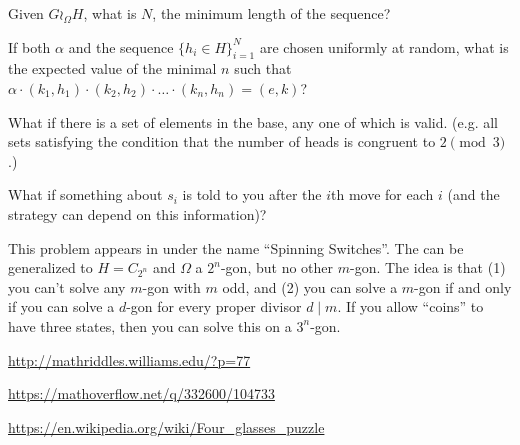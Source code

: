 \documentclass{article}
\begin{document}
\begin{related}
  \item Given $G \wr_\Omega H$, what is $N$, the minimum length of the sequence?
  \item If both $\alpha$ and the sequence $\{h_i \in H\}_{i=1}^N$ are chosen
  uniformly at random, what is the expected value of the minimal $n$ such that $
    \alpha \cdot (k_1, h_1) \cdot (k_2, h_2) \cdot \dots \cdot (k_n, h_n) = (e, k)
  $?
  \item What if there is a set of elements in the base, any one of which is valid.
  (e.g. all sets satisfying the condition that the number of heads is congruent
  to $2 \pmod 3$.)
  \item What if something about $s_i$ is told to you after the $i$th move for each
    $i$ (and the strategy can depend on this information)?
\end{related}
\begin{note}
  This problem appears in \href{Peter Winkler's book}{} under the name
  ``Spinning Switches''.
  The can be generalized to $H = C_{2^n}$ and $\Omega$ a $2^n$-gon,
  but no other $m$-gon.
  The idea is that (1) you can't solve any $m$-gon with $m$ odd, and (2) you
  can solve a $m$-gon if and only if you can solve a $d$-gon for every proper
  divisor $d \mid m$.
  If you allow ``coins'' to have three states, then you can solve this on a
  $3^n$-gon.
\end{note}

\begin{references}
  \item \url{http://mathriddles.williams.edu/?p=77}
  \item \url{https://mathoverflow.net/q/332600/104733}
  \item \url{https://en.wikipedia.org/wiki/Four_glasses_puzzle}
\end{references}
\end{document}
